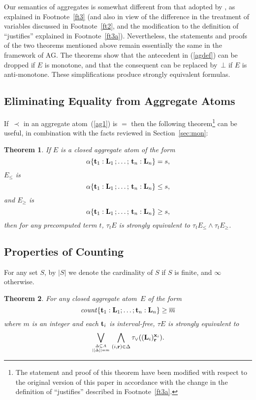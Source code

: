\documentclass{tlp}
\def\beq{\begin{equation}}
\def\eeq#1{\label{#1}\end{equation}}
\newtheorem{theorem}{Theorem}
\begin{document}
Our semantics of aggregates is somewhat different from that adopted
by  \citeyear[Section~3.5]{har14a}, as explained in
Footnote~\ref{ft3} (and also
in view of the difference in the treatment of variables discussed in
Footnote~\ref{ft2}, and the modification to the definition of ``justifies''
explained in Footnote~\ref{ft3a}).  Nevertheless, the statements and proofs of the two
theorems mentioned above remain essentially the same in the framework of AG. The
theorems show that the antecedent in (\ref{agdef}) can be dropped if $E$
is monotone, and that the consequent can be replaced by~$\bot$ if $E$ is
anti-monotone.  These simplifications produce strongly equivalent
formulas.

\subsection{Eliminating Equality from Aggregate Atoms}

If~$\prec$ in an aggregate atom~(\ref{ag1}) is $=$ then the following
theorem\footnote{The statement and proof of this theorem have been
modified with respect to the original version of this paper in accordance
with the change in the definition of ``justifies'' described in
Footnote~\ref{ft3a}.}  can be useful, in combination with the facts reviewed in
Section~\ref{sec:mon}:

\begin{theorem}\label{lem:equality}
If $E$ is a closed aggregate atom of the form
$$
\alpha\{{\bf t}_1 : {\bf L}_1\,;\ldots;\,{\bf t}_n : {\bf L}_n\}= s,
$$
$E_{\le}$ is
$$
\alpha\{{\bf t}_1 : {\bf L}_1\,;\ldots;\,{\bf t}_n : {\bf L}_n\}\leq s,
$$
and $E_{\ge}$ is
$$
\alpha\{{\bf t}_1 : {\bf L}_1\,;\ldots;\,{\bf t}_n : {\bf L}_n\}\geq s,
$$
then for any precomputed term $t$, $\tau_t E$ is strongly equivalent to $\tau_t E_{\le} \land
\tau_t E_{\ge}$.
\end{theorem}

\subsection{Properties of Counting} \label{sec:count}

For any set $S$, by $\lvert S \rvert$ we denote the cardinality of
$S$ if $S$ is finite, and $\infty$ otherwise.

\begin{theorem}\label{lem:geq}
For any closed aggregate atom~$E$ of the form
$$
{\it count}\{{\bf t}_1 : {\bf L}_1; \dots ; {\bf t}_n : {\bf L}_n \} \geq \overline m
$$
where $m$ is an integer and each ${\bf t}_i$ is interval-free, $\tau E$ is
strongly equivalent to
\beq
  \bigvee_{\Delta\subseteq A \atop \lvert [\Delta] \rvert = m}
  \bigwedge_{(i,{\bf r}) \in \Delta}
  \tau_{\lor}(({\bf L}_i)^{{\bf x}_i}_{\bf r}).
\eeq{trans_geq}
\end{theorem}
\end{document}
